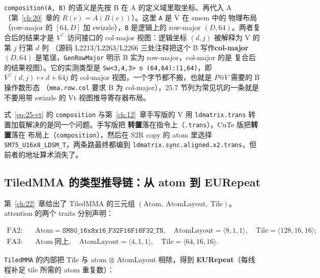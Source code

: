 \texttt{composition\allowbreak{}(A,\allowbreak{} B)} 的语义是先按 B 在 A 的定义域里取坐标、再代入 A
（第~\ref{ch:20}~章的 $R(c)=A(B(c))$）。这里 \texttt{A} 是 V 在 smem 中的
物理布局（row-major 的 $[64,D]$ 加 swizzle），\texttt{B} 是逻辑上的
row-major $(D,64)$。两者复合后的结果才是 $V^\top$ 访问接口的
col-major 视图：逻辑坐标 $(d, j)$ 被解释为 V 的第 $j$ 行第 $d$ 列
（源码 L2213/L2263/L2266 三处注释把这个 B 写作\textbf{col-major $(D,64)$}
是笔误，\texttt{GenRowMajor} 明示 B 实为 row-major，col-major 的是
复合后的结果视图）。它的实测类型是
\texttt{Sw\allowbreak{}<3,\allowbreak{}4,\allowbreak{}3> o \allowbreak{}(64,\allowbreak{}64):\allowbreak{}(1,\allowbreak{}64)}，即 $V^\top(d,j) \mapsto d + 64j$
的 col-major 视图，一个字节都不搬，也就是 $P@V$ 需要的 B 操作数形态
（\texttt{mma.row.col} 要求 B 为 col-major），25.7 节列为常见坑的一条就是
不要用带 swizzle 的 Vt 视图推导寄存器布局。

\begin{remark}
  式~\eqref{eq:25-vt} 的 \texttt{composition} 与第~\ref{ch:12}~章手写版的
  V 用 \texttt{ldmatrix.\allowbreak{}trans} 转置加载解决的是同一个问题。手写版把
  \textbf{转置}落在指令上（\texttt{.trans}），CuTe 版把\textbf{转置}落在
  布局上（\texttt{composition}），然后在 S2R copy 的 atom 里选择
  \texttt{SM75\_\allowbreak{}U16x8\_\allowbreak{}LDSM\_\allowbreak{}T}，两条路最终都编到
  \texttt{ldmatrix.\allowbreak{}sync.\allowbreak{}aligned.\allowbreak{}x2.trans}，但前者的地址算术消失了。
\end{remark}

\subsection{TiledMMA 的类型推导链：从 atom 到 EURepeat}

第~\ref{ch:22}~章给出了 TiledMMA 的三元组
$(\mathrm{Atom},\ \mathrm{AtomLayout},\ \mathrm{Tile})$。attention 的两个
traits 分别声明：

\begin{align}
  \text{FA2:}\quad & \mathrm{Atom}=\mathtt{SM80\_\allowbreak{}16x8x16\_\allowbreak{}F32F16F16F32\_\allowbreak{}TN},\quad
    \mathrm{AtomLayout}=\langle 8,1,1\rangle,\quad \mathrm{Tile}=\langle 128,16,16\rangle ;
  \label{eq:25-mma2}\\
  \text{FA3:}\quad & \mathrm{Atom}\ \text{同上},\quad
    \mathrm{AtomLayout}=\langle 4,1,1\rangle,\quad \mathrm{Tile}=\langle 64,16,16\rangle .
  \label{eq:25-mma3}
\end{align}

\texttt{TiledMMA} 的内部把 Tile 与 atom $\otimes$ AtomLayout 相除，得到
\textbf{EURepeat}（每线程补足 tile 所需的 atom 重复数）：

